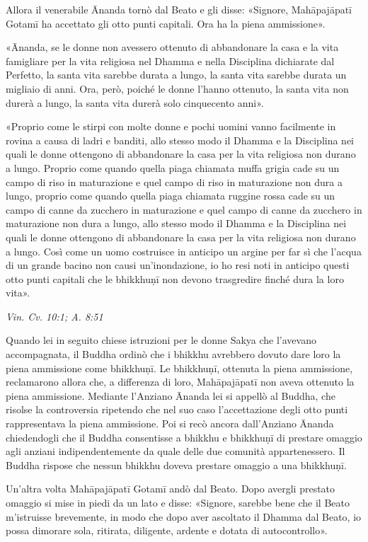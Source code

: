 Allora il venerabile Ānanda tornò dal Beato e gli disse: «Signore,
Mahāpajāpatī Gotamī ha accettato gli otto punti capitali. Ora ha la
piena ammissione».


«Ānanda, se le donne non avessero ottenuto di abbandonare la casa e la
vita famigliare per la vita religiosa nel Dhamma e nella Disciplina
dichiarate dal Perfetto, la santa vita sarebbe durata a lungo, la santa
vita sarebbe durata un migliaio di anni. Ora, però, poiché le donne
l’hanno ottenuto, la santa vita non durerà a lungo, la santa vita durerà
solo cinquecento anni».


«Proprio come le stirpi con molte donne e pochi uomini vanno facilmente
in rovina a causa di ladri e banditi, allo stesso modo il Dhamma e la
Disciplina nei quali le donne ottengono di abbandonare la casa per la
vita religiosa non durano a lungo. Proprio come quando quella piaga
chiamata muffa grigia cade su un campo di riso in maturazione e quel
campo di riso in maturazione non dura a lungo, proprio come quando
quella piaga chiamata ruggine rossa cade su un campo di canne da
zucchero in maturazione e quel campo di canne da zucchero in maturazione
non dura a lungo, allo stesso modo il Dhamma e la Disciplina nei quali
le donne ottengono di abbandonare la casa per la vita religiosa non
durano a lungo. Così come un uomo costruisce in anticipo un argine per
far sì che l’acqua di un grande bacino non causi un’inondazione, io ho
resi noti in anticipo questi otto punti capitali che le bhikkhuṇī non
devono trasgredire finché dura la loro vita».


\emph{Vin. Cv. 10:1; A. 8:51}


 Quando lei in seguito chiese istruzioni per le donne
Sakya che l’avevano accompagnata, il Buddha ordinò che i bhikkhu
avrebbero dovuto dare loro la piena ammissione come bhikkhuṇī. Le
bhikkhuṇī, ottenuta la piena ammissione, reclamarono allora che, a
differenza di loro, Mahāpajāpatī non aveva ottenuto la piena ammissione.
Mediante l’Anziano Ānanda lei si appellò al Buddha, che risolse la
controversia ripetendo che nel suo caso l’accettazione degli otto punti
rappresentava la piena ammissione. Poi si recò ancora dall’Anziano
Ānanda chiedendogli che il Buddha consentisse a bhikkhu e bhikkhuṇī di
prestare omaggio agli anziani indipendentemente da quale delle due
comunità appartenessero. Il Buddha rispose che nessun bhikkhu doveva
prestare omaggio a una bhikkhuṇī.


 Un’altra volta Mahāpajāpatī Gotamī andò dal Beato. Dopo
avergli prestato omaggio si mise in piedi da un lato e disse: «Signore,
sarebbe bene che il Beato m’istruisse brevemente, in modo che dopo aver
ascoltato il Dhamma dal Beato, io possa dimorare sola, ritirata,
diligente, ardente e dotata di autocontrollo».



